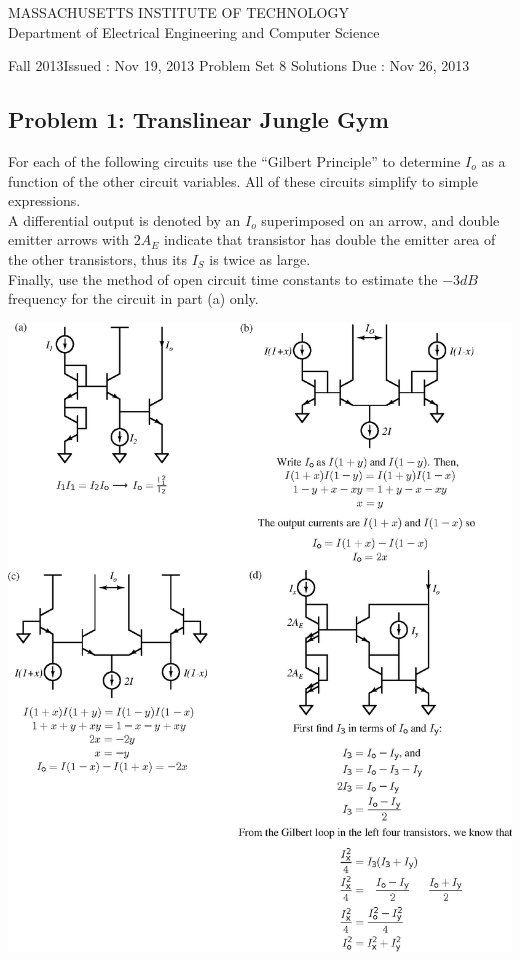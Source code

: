 \documentclass[11pt,twoside]{article}
\newlength{\toppush}
\newcommand{\htitle}[3]{\begin{center}
\vspace*{-\toppush}
{\large MASSACHUSETTS INSTITUTE OF TECHNOLOGY}\\
{\small Department of Electrical Engineering and Computer Science}\\
\vspace*{1ex}{\Large #2}\end{center}
\noindent
\newline\parbox{6.5in}
{Fall 2013\hfill Issued : #1 \newline
 Problem Set 8 Solutions \hfill Due : #3\newline
}}
\newcommand{\handout}[3]{\thispagestyle{empty}
\pagestyle{myheadings}\htitle{#1}{#2}{#3}}
\begin{document}
\handout{Nov 19, 2013}{6.301 Solid State Circuits}{Nov 26, 2013}
\setlength{\parindent}{0pt}

\newcommand{\solution}{
 \medskip
 {\bf Solution:}
}

\hrulefill

\flushleft

\subsection*{Problem 1: Translinear Jungle Gym}
For each of the following circuits use the “Gilbert Principle”
to determine $I_o$ as a function of the other circuit variables.
All of these circuits simplify to simple expressions. \\
A differential output is denoted by an $I_o$ superimposed on an arrow,
 and double emitter arrows with $2A_E$ indicate that transistor has double the emitter area of the other transistors, thus its $I_S$ is twice as large. \\
Finally, use the method of open circuit time constants to estimate the $-3dB$ frequency for the circuit in part (a) only.
\vspace{8ex}
\begin{center}
\includegraphics[width=.9\textwidth]{trans1-soln}
\end{center}
\end{document}
